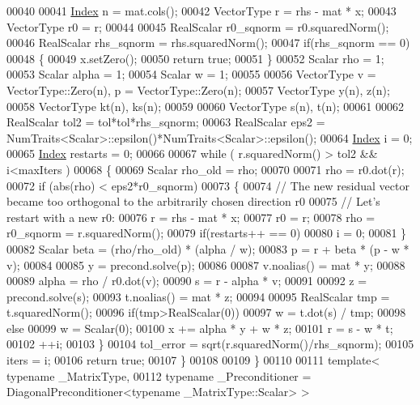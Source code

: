 \begin{DoxyCode}
00040 
00041   \hyperlink{namespace_eigen_a62e77e0933482dafde8fe197d9a2cfde}{Index} n = mat.cols();
00042   VectorType r  = rhs - mat * x;
00043   VectorType r0 = r;
00044   
00045   RealScalar r0\_sqnorm = r0.squaredNorm();
00046   RealScalar rhs\_sqnorm = rhs.squaredNorm();
00047   \textcolor{keywordflow}{if}(rhs\_sqnorm == 0)
00048   \{
00049     x.setZero();
00050     \textcolor{keywordflow}{return} \textcolor{keyword}{true};
00051   \}
00052   Scalar rho    = 1;
00053   Scalar alpha  = 1;
00054   Scalar w      = 1;
00055   
00056   VectorType v = VectorType::Zero(n), p = VectorType::Zero(n);
00057   VectorType y(n),  z(n);
00058   VectorType kt(n), ks(n);
00059 
00060   VectorType s(n), t(n);
00061 
00062   RealScalar tol2 = tol*tol*rhs\_sqnorm;
00063   RealScalar eps2 = NumTraits<Scalar>::epsilon()*NumTraits<Scalar>::epsilon();
00064   \hyperlink{namespace_eigen_a62e77e0933482dafde8fe197d9a2cfde}{Index} i = 0;
00065   \hyperlink{namespace_eigen_a62e77e0933482dafde8fe197d9a2cfde}{Index} restarts = 0;
00066 
00067   \textcolor{keywordflow}{while} ( r.squaredNorm() > tol2 && i<maxIters )
00068   \{
00069     Scalar rho\_old = rho;
00070 
00071     rho = r0.dot(r);
00072     \textcolor{keywordflow}{if} (abs(rho) < eps2*r0\_sqnorm)
00073     \{
00074       \textcolor{comment}{// The new residual vector became too orthogonal to the arbitrarily chosen direction r0}
00075       \textcolor{comment}{// Let's restart with a new r0:}
00076       r  = rhs - mat * x;
00077       r0 = r;
00078       rho = r0\_sqnorm = r.squaredNorm();
00079       \textcolor{keywordflow}{if}(restarts++ == 0)
00080         i = 0;
00081     \}
00082     Scalar beta = (rho/rho\_old) * (alpha / w);
00083     p = r + beta * (p - w * v);
00084     
00085     y = precond.solve(p);
00086     
00087     v.noalias() = mat * y;
00088 
00089     alpha = rho / r0.dot(v);
00090     s = r - alpha * v;
00091 
00092     z = precond.solve(s);
00093     t.noalias() = mat * z;
00094 
00095     RealScalar tmp = t.squaredNorm();
00096     \textcolor{keywordflow}{if}(tmp>RealScalar(0))
00097       w = t.dot(s) / tmp;
00098     \textcolor{keywordflow}{else}
00099       w = Scalar(0);
00100     x += alpha * y + w * z;
00101     r = s - w * t;
00102     ++i;
00103   \}
00104   tol\_error = sqrt(r.squaredNorm()/rhs\_sqnorm);
00105   iters = i;
00106   \textcolor{keywordflow}{return} \textcolor{keyword}{true}; 
00107 \}
00108 
00109 \}
00110 
00111 \textcolor{keyword}{template}< \textcolor{keyword}{typename} \_MatrixType,
00112           \textcolor{keyword}{typename} \_Preconditioner = DiagonalPreconditioner<typename \_MatrixType::Scalar> >

\end{DoxyCode}
